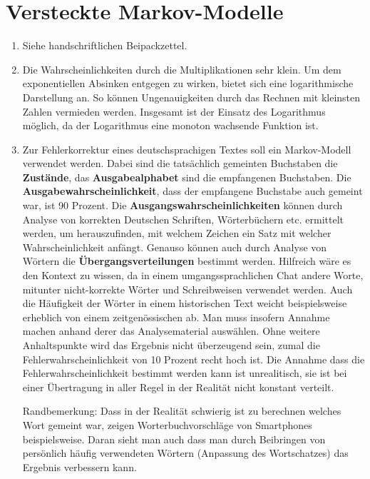 \documentclass[a4paper,10pt]{scrartcl}
\begin{document}
\section{Versteckte Markov-Modelle}
\begin{enumerate}
 \item Siehe handschriftlichen Beipackzettel.
 \item
  Die Wahrscheinlichkeiten durch die Multiplikationen sehr klein. Um dem exponentiellen Absinken entgegen zu wirken, bietet sich eine logarithmische
  Darstellung an. So können Ungenauigkeiten durch das Rechnen mit kleinsten Zahlen vermieden werden. Insgesamt ist der Einsatz des Logarithmus möglich, da der Logarithmus eine monoton wachsende Funktion ist.
 \item
  Zur Fehlerkorrektur eines deutschsprachigen Textes soll ein Markov-Modell verwendet werden. Dabei sind die tatsächlich gemeinten Buchstaben die \textbf{Zustände}, das \textbf{Ausgabealphabet} sind die
  empfangenen Buchstaben. Die \textbf{Ausgabewahrscheinlichkeit}, dass der empfangene Buchstabe auch gemeint war, ist 90 Prozent. Die \textbf{Ausgangswahrscheinlichkeiten} können durch Analyse von korrekten Deutschen Schriften,
  Wörterbüchern etc. ermittelt werden, um herauszufinden, mit welchem Zeichen ein Satz mit welcher Wahrscheinlichkeit anfängt. Genauso können auch durch Analyse von Wörtern die \textbf{Übergangsverteilungen} bestimmt werden.
  Hilfreich wäre es den Kontext zu wissen, da in einem umgangssprachlichen Chat andere Worte, mitunter nicht-korrekte Wörter und Schreibweisen verwendet werden. Auch die Häufigkeit der Wörter in einem
 historischen Text weicht beispielsweise erheblich von einem zeitgenössischen ab.  Man muss insofern Annahme machen anhand derer das Analysematerial auswählen. Ohne weitere Anhaltspunkte wird das Ergebnis
 nicht überzeugend sein, zumal die Fehlerwahrscheinlichkeit von 10 Prozent recht hoch ist. Die Annahme dass die Fehlerwahrscheinlichkeit bestimmt werden kann ist unrealitisch, sie ist bei einer 
 Übertragung in aller Regel in der Realität nicht konstant verteilt.

Randbemerkung: Dass in der Realität schwierig ist zu berechnen welches Wort gemeint war, zeigen Worterbuchvorschläge von Smartphones beispielsweise. Daran sieht man auch dass man durch Beibringen von
persönlich häufig verwendeten Wörtern (Anpassung des Wortschatzes) das Ergebnis verbessern kann.
\end{enumerate}
\end{document}
